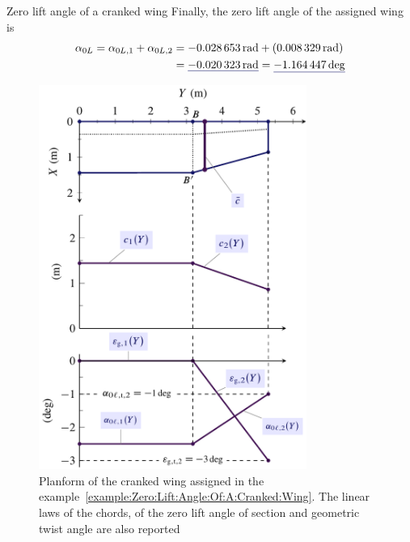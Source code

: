\documentclass[[12pt,twoside]{book}
\begin{document}
\begin{myExampleX}{Zero lift angle of a cranked wing}{}
Finally, the zero lift angle of the assigned wing is
\[
\begin{split}
\alpha_{0L} = \alpha_{0L,1} + \alpha_{0L,2} 
  & {}= \SI[round-precision=4]{\myAlphaZeroLiftWingIRAD}{\radian}
    + ( \SI[round-precision=5]{\myAlphaZeroLiftWingIIRAD}{\radian} )
\\
  & {}= \mathunderline{mydarkblue}{ \SI[round-precision=4]{\myAlphaZeroLiftWingRAD}{\radian} }
    = \mathunderline{mydarkblue}{ \SI[round-precision=2]{\myAlphaZeroLiftWingDEG}{\deg} }
\end{split}
\]
%
\begin{figure}[t]%
  \centering
    \includegraphics[width=0.78\textwidth]{Chapter_2/zero_lift_angle_of_a_cranked_wing/wing_alpha_zero_lift_1A_drawing.pdf}
  \caption{
           Planform of the cranked wing assigned in the example~\ref{example:Zero:Lift:Angle:Of:A:Cranked:Wing}. The linear laws of the chords, of the zero lift angle of section and geometric twist angle are also reported
 }
  \label{fig:Zero:Lift:Cranked}%
\end{figure}
%
\end{myExampleX}
\end{document}
